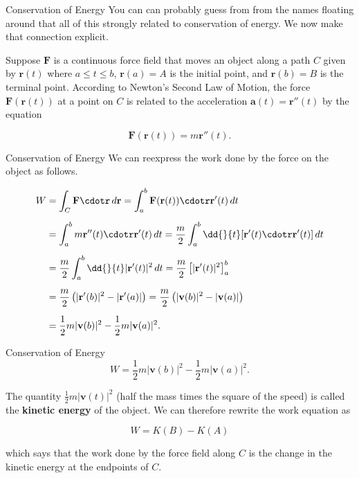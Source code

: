 \documentclass[11pt,english,
handout
]{beamer}
\begin{document}
\begin{frame}[t]{Conservation of Energy}
\small
You can can probably guess from from the names floating around that all of this strongly related to conservation of energy. We now make that connection explicit.\pause 

\lspace
Suppose $\mathbf{F}$ is a continuous force field that moves an object along a path $C$ given by $\mathbf{r}(t)$ where $a\leq t\leq b$, $\mathbf{r}(a)=A$ is the initial point, and $\mathbf{r}(b)=B$ is the terminal point. \pause According to Newton's Second Law of Motion, the force $\mathbf{F}(\mathbf{r}(t))$ at a point on $C$ is related to the acceleration $\mathbf{a}(t)=\mathbf{r}''(t)$ by the equation

\[
\mathbf{F}(\mathbf{r}(t))=m\mathbf{r}''(t).
\]
\end{frame}








\begin{frame}[t]{Conservation of Energy}
\small
We can reexpress the work done by the force on the object as follows.

\begin{align*}
W&=\int_C\mathbf{F}\cdotr\,d\mathbf{r}=\int_a^b\mathbf{F}(\mathbf{r}(t))\cdotr\mathbf{r}'(t)\,dt\\[2mm]
&=\int_a^bm\mathbf{r}''(t)\cdotr\mathbf{r}'(t)\,dt=\frac{m}{2}\int_a^b\dd{}{t}[\mathbf{r}'(t)\cdotr\mathbf{r}'(t)]\,dt\\[2mm]
&=\frac{m}{2}\int_a^b\dd{}{t}|\mathbf{r}'(t)|^2\,dt=\frac{m}{2}\left[|\mathbf{r}'(t)|^2\right]_a^b\\[2mm]
&=\frac{m}{2}\left(|\mathbf{r}'(b)|^2-|\mathbf{r}'(a)|\right)=\frac{m}{2}\left(|\mathbf{v}(b)|^2-|\mathbf{v}(a)|\right)\\[2mm]
&=\frac{1}{2}m|\mathbf{v}(b)|^2-\frac{1}{2}m|\mathbf{v}(a)|^2.
\end{align*}
\end{frame}









\begin{frame}{Conservation of Energy}
\small
\[
W=\frac{1}{2}m|\mathbf{v}(b)|^2-\frac{1}{2}m|\mathbf{v}(a)|^2.
\]

The quantity $\displaystyle \frac{1}{2}m|\mathbf{v}(t)|^2$ (half the mass times the square of the speed) is called the \textbf{kinetic energy} of the object. \pause We can therefore rewrite the work equation as

\[
W=K(B)-K(A)
\]

which says that the work done by the force field along $C$ is the change in the kinetic energy at the endpoints of $C$.
\end{frame}
\end{document}
